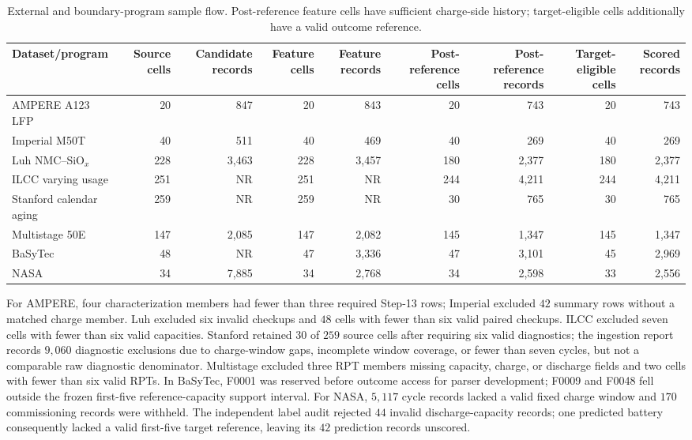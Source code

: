 \documentclass[11pt]{article}
\begin{document}
\begin{landscape}
\begin{table}[H]
\centering
\caption{External and boundary-program sample flow. Post-reference feature cells have sufficient charge-side history; target-eligible cells additionally have a valid outcome reference.}
\label{tab:external_flow}
\scriptsize
\setlength{\tabcolsep}{3.7pt}
\renewcommand{\arraystretch}{1.05}
\begin{tabular}{@{}lrrrrrrrr@{}}
\toprule
Dataset/program & Source cells & Candidate records & Feature cells & Feature records & Post-reference cells & Post-reference records & Target-eligible cells & Scored records \\
\midrule
AMPERE A123 LFP & 20 & 847 & 20 & 843 & 20 & 743 & 20 & 743 \\
Imperial M50T & 40 & 511 & 40 & 469 & 40 & 269 & 40 & 269 \\
Luh NMC--SiO$_x$ & 228 & 3,463 & 228 & 3,457 & 180 & 2,377 & 180 & 2,377 \\
ILCC varying usage & 251 & NR & 251 & NR & 244 & 4,211 & 244 & 4,211 \\
Stanford calendar aging & 259 & NR & 259 & NR & 30 & 765 & 30 & 765 \\
Multistage 50E & 147 & 2,085 & 147 & 2,082 & 145 & 1,347 & 145 & 1,347 \\
BaSyTec & 48 & NR & 47 & 3,336 & 47 & 3,101 & 45 & 2,969 \\
NASA & 34 & 7,885 & 34 & 2,768 & 34 & 2,598 & 33 & 2,556 \\
\bottomrule
\end{tabular}
\end{table}
\end{landscape}

For AMPERE, four characterization members had fewer than three required Step-13 rows; Imperial excluded $42$ summary rows without a matched charge member. Luh excluded six invalid checkups and $48$ cells with fewer than six valid paired checkups. ILCC excluded seven cells with fewer than six valid capacities. Stanford retained $30$ of $259$ source cells after requiring six valid diagnostics; the ingestion report records $9{,}060$ diagnostic exclusions due to charge-window gaps, incomplete window coverage, or fewer than seven cycles, but not a comparable raw diagnostic denominator. Multistage excluded three RPT members missing capacity, charge, or discharge fields and two cells with fewer than six valid RPTs. In BaSyTec, F0001 was reserved before outcome access for parser development; F0009 and F0048 fell outside the frozen first-five reference-capacity support interval. For NASA, $5{,}117$ cycle records lacked a valid fixed charge window and $170$ commissioning records were withheld. The independent label audit rejected $44$ invalid discharge-capacity records; one predicted battery consequently lacked a valid first-five target reference, leaving its $42$ prediction records unscored.
\end{document}
